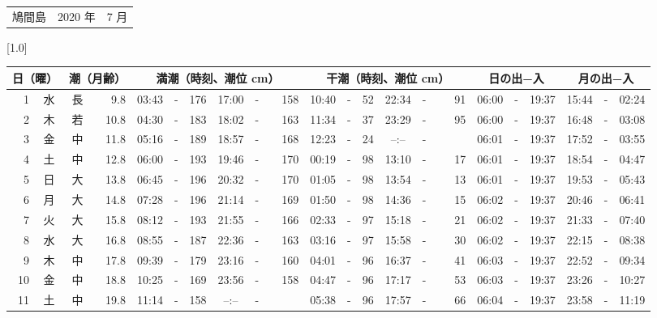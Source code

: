 \documentclass[12pt,a4j]{jsarticle}
\begin{document}
 \begin{table}[htbp]
 \begin{center}
 \begin{tabular}{lcc}
 \LARGE{鳩間島}  & \large{2020 年} & \large{ 7 月} \\
 \end{tabular}
 \end{center}
 \begin{center}
    \scalebox{0.7}[1.0]{
    \begin{tabular}{|rc|cr|ccrccr|ccrccr|ccc|ccc|}
    \hline
    \multicolumn{2}{|c|}{日（曜）} & \multicolumn{2}{c|}{潮（月齢）} & \multicolumn{6}{c|}{満潮（時刻、潮位 cm）} & \multicolumn{6}{c|}{干潮（時刻、潮位 cm）} & \multicolumn{3}{c|}{日の出−入} &  \multicolumn{3}{c|}{月の出−入}\\
 \hline
 1 & 水 & 長 &  9.8 &  03:43 &-& 176 &  17:00 &-& 158 &  10:40 &-&  52 &  22:34 &-&  91 & 06:00 & -& 19:37 & 15:44 & -& 02:24 \\
 2 & 木 & 若 & 10.8 &  04:30 &-& 183 &  18:02 &-& 163 &  11:34 &-&  37 &  23:29 &-&  95 & 06:00 & -& 19:37 & 16:48 & -& 03:08 \\
 3 & 金 & 中 & 11.8 &  05:16 &-& 189 &  18:57 &-& 168 &  12:23 &-&  24 &  --:-- &-&~~~~~ & 06:01 & -& 19:37 & 17:52 & -& 03:55 \\
 4 & 土 & 中 & 12.8 &  06:00 &-& 193 &  19:46 &-& 170 &  00:19 &-&  98 &  13:10 &-&  17 & 06:01 & -& 19:37 & 18:54 & -& 04:47 \\
 5 & 日 & 大 & 13.8 &  06:45 &-& 196 &  20:32 &-& 170 &  01:05 &-&  98 &  13:54 &-&  13 & 06:01 & -& 19:37 & 19:53 & -& 05:43 \\
 6 & 月 & 大 & 14.8 &  07:28 &-& 196 &  21:14 &-& 169 &  01:50 &-&  98 &  14:36 &-&  15 & 06:02 & -& 19:37 & 20:46 & -& 06:41 \\
 7 & 火 & 大 & 15.8 &  08:12 &-& 193 &  21:55 &-& 166 &  02:33 &-&  97 &  15:18 &-&  21 & 06:02 & -& 19:37 & 21:33 & -& 07:40 \\
 8 & 水 & 大 & 16.8 &  08:55 &-& 187 &  22:36 &-& 163 &  03:16 &-&  97 &  15:58 &-&  30 & 06:02 & -& 19:37 & 22:15 & -& 08:38 \\
 9 & 木 & 中 & 17.8 &  09:39 &-& 179 &  23:16 &-& 160 &  04:01 &-&  96 &  16:37 &-&  41 & 06:03 & -& 19:37 & 22:52 & -& 09:34 \\
10 & 金 & 中 & 18.8 &  10:25 &-& 169 &  23:56 &-& 158 &  04:47 &-&  96 &  17:17 &-&  53 & 06:03 & -& 19:37 & 23:26 & -& 10:27 \\
11 & 土 & 中 & 19.8 &  11:14 &-& 158 &  --:-- &-&~~~~~ &  05:38 &-&  96 &  17:57 &-&  66 & 06:04 & -& 19:37 & 23:58 & -& 11:19 \\

\end{tabular}}
\end{center}
\end{table}
\end{document}
